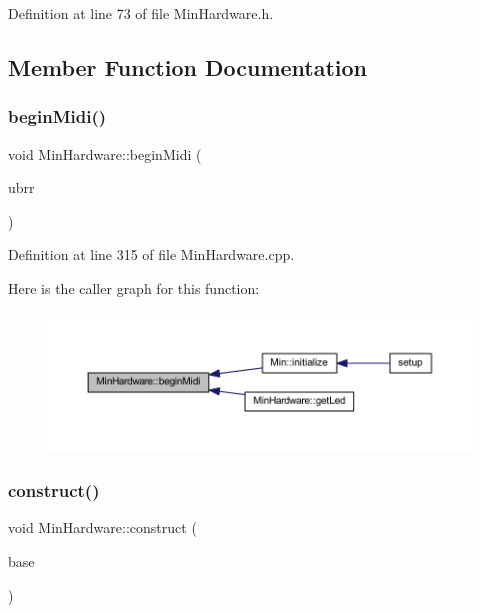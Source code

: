 Definition at line 73 of file Min\+Hardware.\+h.



\subsection{Member Function Documentation}
\mbox{\label{class_min_hardware_af4ce30a68a24c15d0149f2e65d72cc33}} 
\subsubsection{\texorpdfstring{begin\+Midi()}{beginMidi()}}
{\footnotesize\ttfamily void Min\+Hardware\+::begin\+Midi (\begin{DoxyParamCaption}\item[{unsigned int}]{ubrr }\end{DoxyParamCaption})}



Definition at line 315 of file Min\+Hardware.\+cpp.

Here is the caller graph for this function\+:
\nopagebreak
\begin{figure}[H]
\begin{center}
\leavevmode
\includegraphics[width=350pt]{class_min_hardware_af4ce30a68a24c15d0149f2e65d72cc33_icgraph}
\end{center}
\end{figure}
\mbox{\label{class_min_hardware_a39382d7c1fcdcec2858c01c05d4c35aa}} 
\subsubsection{\texorpdfstring{construct()}{construct()}}
{\footnotesize\ttfamily void Min\+Hardware\+::construct (\begin{DoxyParamCaption}\item[{\hyperlink{class_min_hardware_base}{Min\+Hardware\+Base} $\ast$}]{base }\end{DoxyParamCaption})}



